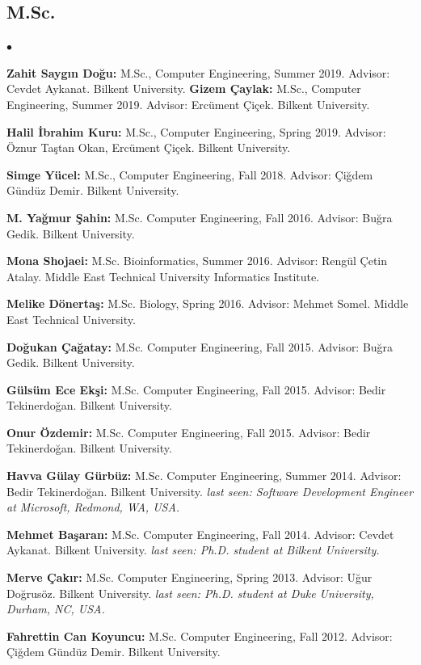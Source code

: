 \documentclass[margin,line]{res}
\newenvironment{list2}{
  \begin{list}{$\bullet$}{%
      \setlength{\itemsep}{0.1cm}
      \setlength{\parsep}{0in} \setlength{\parskip}{0in}
      \setlength{\topsep}{0in} \setlength{\partopsep}{0in} 
      \setlength{\leftmargin}{0.2in}}}{\end{list}}
\begin{document}
\begin{resume}
\vspace*{-.4cm}
\subsection{\small \sc M.Sc.}
\begin{list2}
\item
{\bf  Zahit Saygın Doğu:} M.Sc., Computer Engineering, Summer 2019.
  Advisor: Cevdet Aykanat.
  Bilkent University.
{\bf  Gizem Çaylak:} M.Sc., Computer Engineering, Summer 2019.
  Advisor: Ercüment Çiçek.
  Bilkent University.
\item
{\bf  Halil İbrahim Kuru:} M.Sc., Computer Engineering, Spring 2019.
  Advisor: Öznur Taştan Okan, Ercüment Çiçek.
  Bilkent University.
\item
  {\bf Simge Yücel:} M.Sc., Computer Engineering, Fall 2018.
  Advisor: Çiğdem Gündüz Demir.
  Bilkent University.
\item
  {\bf M. Yağmur Şahin:} M.Sc. Computer Engineering, Fall 2016. Advisor: Buğra Gedik.
  Bilkent University. 
\item
  {\bf Mona Shojaei:} M.Sc. Bioinformatics,  Summer 2016. Advisor: Rengül Çetin Atalay.
  Middle East Technical University Informatics Institute.
\item
  {\bf Melike Dönertaş:} M.Sc. Biology, Spring 2016. Advisor: Mehmet Somel.
  Middle East Technical University. 
\item
  {\bf Doğukan Çağatay:} M.Sc. Computer Engineering,  Fall 2015. Advisor: Buğra Gedik.
  Bilkent University. 
\item
  {\bf Gülsüm Ece Ekşi:} M.Sc. Computer Engineering,  Fall 2015. Advisor: Bedir Tekinerdoğan.
  Bilkent University. 
\item
  {\bf Onur Özdemir:} M.Sc. Computer Engineering,  Fall 2015. Advisor: Bedir Tekinerdoğan.
  Bilkent University. 
\item
  {\bf Havva Gülay Gürbüz:} M.Sc. Computer Engineering, Summer 2014. Advisor: Bedir Tekinerdoğan.
  Bilkent University. 
  {\it last seen: Software Development Engineer at Microsoft, Redmond, WA, USA.}
\item
  {\bf Mehmet Başaran:} M.Sc. Computer Engineering, Fall 2014. Advisor: Cevdet Aykanat.
  Bilkent University. {\it last seen: Ph.D. student at Bilkent University.}
\item
  {\bf Merve Çakır:} M.Sc. Computer Engineering, Spring 2013. Advisor: Uğur Doğrusöz.
  Bilkent University. {\it last seen: Ph.D. student at Duke University, Durham, NC, USA.}
\item
  {\bf Fahrettin Can Koyuncu:} M.Sc. Computer Engineering, Fall 2012. Advisor: Çiğdem Gündüz Demir.
  Bilkent University. 
  \end{list2}




\end{resume}
\end{document}
